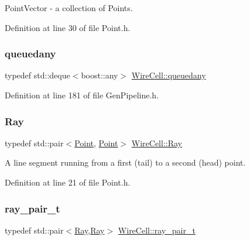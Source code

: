 Point\+Vector -\/ a collection of Points. 



Definition at line 30 of file Point.\+h.

\mbox{\label{namespace_wire_cell_adf91b92bfda348a56a463737a79b6bbf}} 
\subsubsection{\texorpdfstring{queuedany}{queuedany}}
{\footnotesize\ttfamily typedef std\+::deque$<$boost\+::any$>$ \hyperlink{namespace_wire_cell_adf91b92bfda348a56a463737a79b6bbf}{Wire\+Cell\+::queuedany}}



Definition at line 181 of file Gen\+Pipeline.\+h.

\mbox{\label{namespace_wire_cell_a3ab20d9b438feb7eb1ffaab9ba98af0c}} 
\subsubsection{\texorpdfstring{Ray}{Ray}}
{\footnotesize\ttfamily typedef std\+::pair$<$\hyperlink{namespace_wire_cell_ab2b2565fa6432efbb4513c14c988cda9}{Point}, \hyperlink{namespace_wire_cell_ab2b2565fa6432efbb4513c14c988cda9}{Point}$>$ \hyperlink{namespace_wire_cell_a3ab20d9b438feb7eb1ffaab9ba98af0c}{Wire\+Cell\+::\+Ray}}



A line segment running from a first (tail) to a second (head) point. 



Definition at line 21 of file Point.\+h.

\mbox{\label{namespace_wire_cell_a8d74e36d330a8250d92fd4415822c5bc}} 
\subsubsection{\texorpdfstring{ray\+\_\+pair\+\_\+t}{ray\_pair\_t}}
{\footnotesize\ttfamily typedef std\+::pair$<$\hyperlink{namespace_wire_cell_a3ab20d9b438feb7eb1ffaab9ba98af0c}{Ray},\hyperlink{namespace_wire_cell_a3ab20d9b438feb7eb1ffaab9ba98af0c}{Ray}$>$ \hyperlink{namespace_wire_cell_a8d74e36d330a8250d92fd4415822c5bc}{Wire\+Cell\+::ray\+\_\+pair\+\_\+t}}




